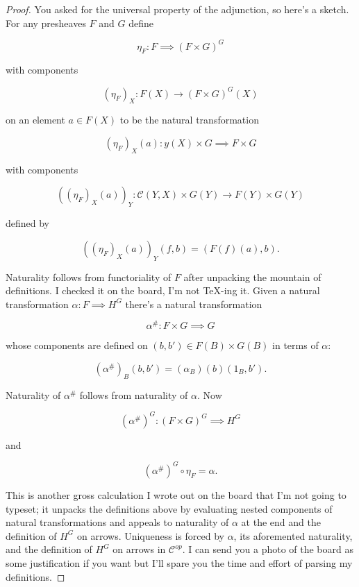 \documentclass[11pt]{amsart}
\theoremstyle{plain}
\theoremstyle{definition}
\newcommand{\cC}{{\mathcal C}}
\newcommand{\noi}{{\noindent}}
\begin{document}
\begin{proof}
    \noi You asked for the universal property of the adjunction, so here's a sketch. For any presheaves $F$ and $G$ define 

    \[ \eta_F : F \implies (F \times G)^G\] 

    \noi with components

    \[ (\eta_F)_X : F(X) \to (F \times G)^G (X)\]

    \noi on an element $a \in F(X)$ to be the natural transformation 

    \[ (\eta_F)_X(a) : y(X) \times G \implies F \times G \]

    \noi with components 

    \[ \left( (\eta_F)_X(a) \right)_Y : \cC(Y,X) \times G(Y) \to F(Y) \times G(Y)\] 

    \noi defined by 

    \[ \left( (\eta_F)_X(a) \right)_Y ( f , b) = ( F(f)(a) , b). \]

    \noi Naturality follows from functoriality of $F$ after unpacking the mountain of definitions. I checked it on the board, I'm not TeX-ing it. Given a natural transformation $\alpha : F \implies H^G$ there's a natural transformation  

    \[ \alpha^\# : F \times G \implies G\]

    \noi whose components are defined on $(b,b') \in F(B) \times G(B)$ in terms of $\alpha$: 

    \[ (\alpha^\#)_B (b,b') = (\alpha_B)(b)(1_B, b').\]

    \noi Naturality of $\alpha^\#$ follows from naturality of $\alpha$. Now 

    \[   (\alpha^\#)^G  : (F \times G)^G \implies H^G \]

    \noi and 

    \[ (\alpha^\#)^G  \circ \eta_F = \alpha . \] 

    \noi This is another gross calculation I wrote out on the board that I'm not going to typeset; it unpacks the definitions above by evaluating nested components of natural transformations and appeals to naturality of $\alpha$ at the end and the definition of $H^G$ on arrows. Uniqueness is forced by $\alpha$, its aforemented naturality, and the definition of $H^G$ on arrows in $\cC^{op}$. I can send you a photo of the board as some justification if you want but I'll spare you the time and effort of parsing my definitions. 
    \end{proof} 
    
\end{document}
